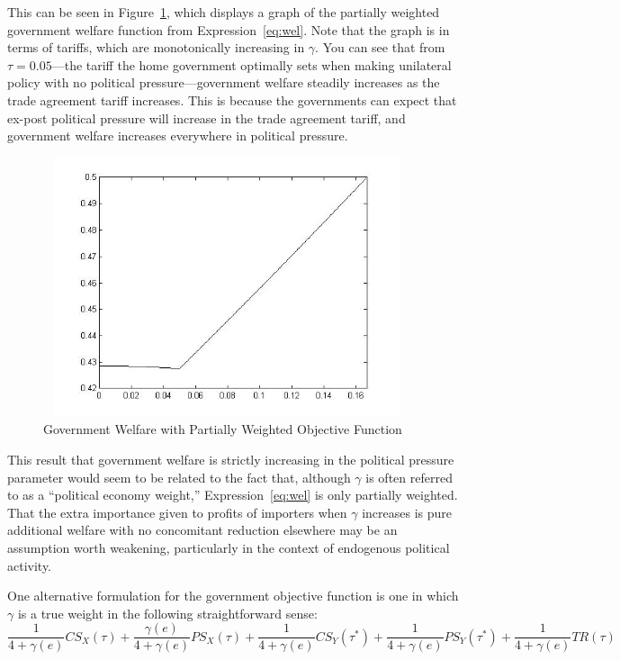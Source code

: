 \documentclass[12pt]{article}
\newcommand{\ga}{\gamma}
\begin{document}
This can be seen in Figure~\ref{fig:unweight}, which displays a graph of the partially weighted government welfare function from Expression~\ref{eq:wel}. Note that the graph is in terms of tariffs, which are monotonically increasing in $\ga$. You can see that from $\tau=0.05$---the tariff the home government optimally sets when making unilateral policy with no political pressure---government welfare steadily increases as the trade agreement tariff increases. This is because the governments can expect that ex-post political pressure will increase in the trade agreement tariff, and government welfare increases everywhere in political pressure.

\begin{figure}
\begin{center}
\includegraphics[height=3in, width=4.25in]{unweight.jpg}
\end{center}
\caption{Government Welfare with Partially Weighted Objective Function \label{fig:unweight}}
\end{figure}

This result that government welfare is strictly increasing in the political pressure parameter would seem to be related to the fact that, although $\ga$ is often referred to as a ``political economy weight,'' Expression~\ref{eq:wel} is only partially weighted. That the extra importance given to profits of importers when $\ga$ increases is pure additional welfare with no concomitant reduction elsewhere may be an assumption worth weakening, particularly in the context of endogenous political activity. 

One alternative formulation for the government objective function is one in which $\ga$ is a true weight in the following straightforward sense:
\begin{equation}
  \frac{1}{4+\ga(e)}CS_X(\tau) + \frac{\ga(e)}{4+\ga(e)}PS_X(\tau) + \frac{1}{4+\ga(e)}CS_Y(\tau^*) + \frac{1}{4+\ga(e)}PS_Y(\tau^*) + \frac{1}{4+\ga(e)}TR(\tau)
  \label{eq:weighted}
\end{equation}
\end{document}
